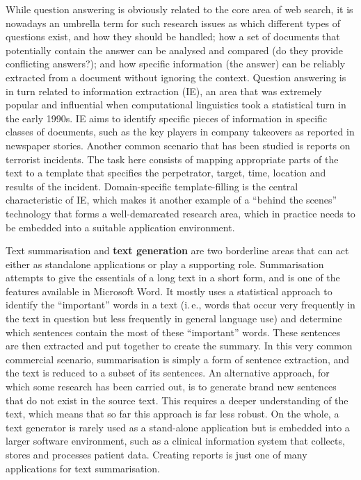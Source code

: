 \documentclass[]{../../metanetpaper}
\begin{document}
\begin{multicols}{2}
While question answering is obviously related to the core area of web search, it is nowadays an umbrella term for such research issues as which different types of questions exist, and how they should be handled; how a set of documents that potentially contain the answer can be analysed and compared (do they provide conflicting answers?); and how specific information (the answer) can be reliably extracted from a document without ignoring the context. Question answering is in turn related to information extraction (IE), an area that was extremely popular and influential when computational linguistics took a statistical turn in the early 1990s. IE aims to identify specific pieces of information in specific classes of documents, such as the key players in company takeovers as reported in newspaper stories. Another common scenario that has been studied is reports on terrorist incidents. The task here consists of mapping appropriate parts of the text to a template that specifies the perpetrator, target, time, location and results of the incident. Domain-specific template-filling is the central characteristic of IE, which makes it another example of a “behind the scenes” technology that forms a well-demarcated research area, which in practice needs to be embedded into a suitable application environment.


Text summarisation and \textbf{text generation} are two borderline areas that can act either as standalone applications or play a supporting role. Summarisation attempts to give the essentials of a long text in a short form, and is one of the features available in Microsoft Word. It mostly uses a statistical approach to identify the “important” words in a text (i.\,e., words that occur very frequently in the text in question but less frequently in general language use) and determine which sentences contain the most of these “important” words. These sentences are then extracted and put together to create the summary. In this very common commercial scenario, summarisation is simply a form of sentence extraction, and the text is reduced to a subset of its sentences. An alternative approach, for which some research has been carried out, is to generate brand new sentences that do not exist in the source text. This requires a deeper understanding of the text, which means that so far this approach is far less robust. On the whole, a text generator is rarely used as a stand-alone application but is embedded into a larger software environment, such as a clinical information system that collects, stores and processes patient data. Creating reports is just one of many applications for text summarisation. 


\end{multicols}
\end{document}
